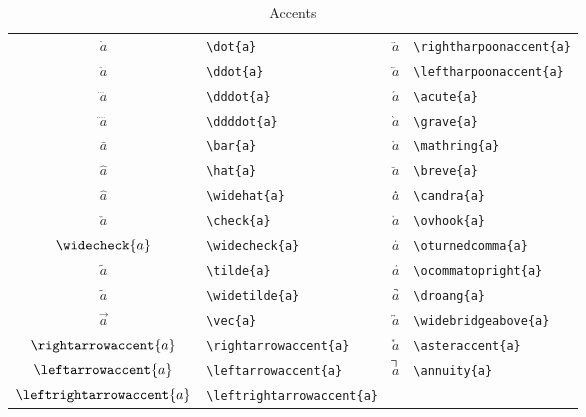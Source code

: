 \documentclass[captions=tableheading]{scrartcl}
\begin{document}
\begin{table}
  \caption{Accents}
  \label{tab:accents}
  \centering
  \begin{tabular}[c]{cl@{\hskip 3em}cl}
    \toprule
    $\dot{a}$ & \verb|\dot{a}| &
    $\rightharpoonaccent{a}$ & \verb|\rightharpoonaccent{a}| \\
    $\ddot{a}$ & \verb|\ddot{a}| &
    $\leftharpoonaccent{a}$ & \verb|\leftharpoonaccent{a}| \\
    $\dddot{a}$ & \verb|\dddot{a}| &
    $\acute{a}$ & \verb|\acute{a}| \\
    $\ddddot{a}$ & \verb|\ddddot{a}| &
    $\grave{a}$ & \verb|\grave{a}| \\
    $\bar{a}$ & \verb|\bar{a}| &
    $\mathring{a}$ & \verb|\mathring{a}| \\
    \addlinespace
    $\hat{a}$ & \verb|\hat{a}| &
    $\breve{a}$ & \verb|\breve{a}| \\
    $\widehat{a}$ & \verb|\widehat{a}| &
    $\candra{a}$ & \verb|\candra{a}| \\
    $\check{a}$ & \verb|\check{a}| &
    $\ovhook{a}$ & \verb|\ovhook{a}| \\
    $\widecheck{a}$ & \verb|\widecheck{a}| &
    $\oturnedcomma{a}$ & \verb|\oturnedcomma{a}| \\
    $\tilde{a}$ & \verb|\tilde{a}| &
    $\ocommatopright{a}$ & \verb|\ocommatopright{a}| \\
    $\widetilde{a}$ & \verb|\widetilde{a}| &
    $\droang{a}$ & \verb|\droang{a}| \\
    \addlinespace
    $\vec{a}$ & \verb|\vec{a}| &
    $\widebridgeabove{a}$ & \verb|\widebridgeabove{a}| \\
    $\rightarrowaccent{a}$ & \verb|\rightarrowaccent{a}| &
    $\asteraccent{a}$ & \verb|\asteraccent{a}| \\
    $\leftarrowaccent{a}$ & \verb|\leftarrowaccent{a}| &
    $\annuity{a}$ & \verb|\annuity{a}| \\
    $\leftrightarrowaccent{a}$ & \verb|\leftrightarrowaccent{a}| &
    & \\
    \bottomrule
  \end{tabular}
\end{table}
\end{document}

